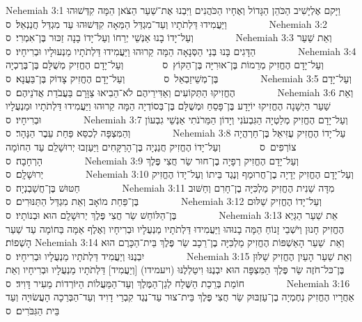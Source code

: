 Nehemiah 3:1	וַיָּקם אֶלְיָשִׁיב הַכֹּהֵן הַגָּדוֹל וְאֶחָיו הַכֹּהֲנִים וַיִּבְנוּ אֶת־שַׁעַר הַצֹּאן הֵמָּה קִדְּשׁוּהוּ וַיַּעֲמִידוּ דַּלְתֹתָיו וְעַד־מִגְדַּל הַמֵּאָה קִדְּשׁוּהוּ עַד מִגְדַּל חֲנַנְאֵל׃ {ס}        
Nehemiah 3:2	וְעַל־יָדוֹ בָנוּ אַנְשֵׁי יְרֵחוֹ וְעַל־יָדוֹ בָנָה זַכּוּר בֶּן־אִמְרִי׃ {ס}        
Nehemiah 3:3	וְאֵת שַׁעַר הַדָּגִים בָּנוּ בְּנֵי הַסְּנָאָה הֵמָּה קֵרוּהוּ וַיַּעֲמִידוּ דַּלְתֹתָיו מַנְעוּלָיו וּבְרִיחָיו׃ {ס}        
Nehemiah 3:4	וְעַל־יָדָם הֶחֱזִיק מְרֵמוֹת בֶּן־אוּרִיָּה בֶּן־הַקּוֹץ {ס}        וְעַל־יָדָם הֶחֱזִיק מְשֻׁלָּם בֶּן־בֶּרֶכְיָה בֶּן־מְשֵׁיזַבְאֵל {ס}        וְעַל־יָדָם הֶחֱזִיק צָדוֹק בֶּן־בַּעֲנָא׃ {ס}        
Nehemiah 3:5	וְעַל־יָדָם הֶחֱזִיקוּ הַתְּקוֹעִים וְאַדִּירֵיהֶם לֹא־הֵבִיאוּ צַוָּרָם בַּעֲבֹדַת אֲדֹנֵיהֶם׃ {ס}        
Nehemiah 3:6	וְאֵת שַׁעַר הַיְשָׁנָה הֶחֱזִיקוּ יוֹיָדָע בֶּן־פָּסֵחַ וּמְשֻׁלָּם בֶּן־בְּסוֹדְיָה הֵמָּה קֵרוּהוּ וַיַּעֲמִידוּ דַּלְתֹתָיו וּמַנְעֻלָיו וּבְרִיחָיו׃ {ס}        
Nehemiah 3:7	וְעַל־יָדָם הֶחֱזִיק מְלַטְיָה הַגִּבְעֹנִי וְיָדוֹן הַמֵּרֹנֹתִי אַנְשֵׁי גִבְעוֹן וְהַמִּצְפָּה לְכִסֵּא פַּחַת עֵבֶר הַנָּהָר׃ {ס}        
Nehemiah 3:8	עַל־יָדוֹ הֶחֱזִיק עֻזִּיאֵל בֶּן־חַרְהֲיָה צוֹרְפִים {ס}        וְעַל־יָדוֹ הֶחֱזִיק חֲנַנְיָה בֶּן־הָרַקָּחִים וַיַּעַזְבוּ יְרוּשָׁלַ͏ִם עַד הַחוֹמָה הָרְחָבָה׃ {ס}        
Nehemiah 3:9	וְעַל־יָדָם הֶחֱזִיק רְפָיָה בֶן־חוּר שַׂר חֲצִי פֶּלֶךְ יְרוּשָׁלָ͏ִם׃ {ס}        
Nehemiah 3:10	וְעַל־יָדָם הֶחֱזִיק יְדָיָה בֶן־חֲרוּמַף וְנֶגֶד בֵּיתוֹ וְעַל־יָדוֹ הֶחֱזִיק חַטּוּשׁ בֶּן־חֲשַׁבְנְיָה׃ {ס}        
Nehemiah 3:11	מִדָּה שֵׁנִית הֶחֱזִיק מַלְכִּיָּה בֶן־חָרִם וְחַשּׁוּב בֶּן־פַּחַת מוֹאָב וְאֵת מִגְדַּל הַתַּנּוּרִים׃ {ס}        
Nehemiah 3:12	וְעַל־יָדוֹ הֶחֱזִיק שַׁלּוּם בֶּן־הַלּוֹחֵשׁ שַׂר חֲצִי פֶּלֶךְ יְרוּשָׁלָ͏ִם הוּא וּבְנוֹתָיו׃ {ס}        
Nehemiah 3:13	אֵת שַׁעַר הַגַּיְא הֶחֱזִיק חָנוּן וְיֹשְׁבֵי זָנוֹחַ הֵמָּה בָנוּהוּ וַיַּעֲמִידוּ דַּלְתֹתָיו מַנְעֻלָיו וּבְרִיחָיו וְאֶלֶף אַמָּה בַּחוֹמָה עַד שַׁעַר הָשְׁפוֹת׃
Nehemiah 3:14	וְאֵת  שַׁעַר הָאַשְׁפּוֹת הֶחֱזִיק מַלְכִּיָּה בֶן־רֵכָב שַׂר פֶּלֶךְ בֵּית־הַכָּרֶם הוּא יִבְנֶנּוּ וְיַעֲמִיד דַּלְתֹתָיו מַנְעֻלָיו וּבְרִיחָיו׃ {ס}        
Nehemiah 3:15	וְאֵת שַׁעַר הָעַיִן הֶחֱזִיק שַׁלּוּן בֶּן־כּל־חֹזֶה שַׂר פֶּלֶךְ הַמִּצְפָּה הוּא יִבְנֶנּוּ וִיטַלְלֶנּוּ (ויעמידו) [וְיַעֲמִיד] דַּלְתֹתָיו מַנְעֻלָיו וּבְרִיחָיו וְאֵת חוֹמַת בְּרֵכַת הַשֶּׁלַח לְגַן־הַמֶּלֶךְ וְעַד־הַמַּעֲלוֹת הַיּוֹרְדוֹת מֵעִיר דָּוִיד׃ {ס}        
Nehemiah 3:16	אַחֲרָיו הֶחֱזִיק נְחֶמְיָה בֶן־עַזְבּוּק שַׂר חֲצִי פֶּלֶךְ בֵּית־צוּר עַד־נֶגֶד קִבְרֵי דָוִיד וְעַד־הַבְּרֵכָה הָעֲשׂוּיָה וְעַד בֵּית הַגִּבֹּרִים׃ {ס}        
